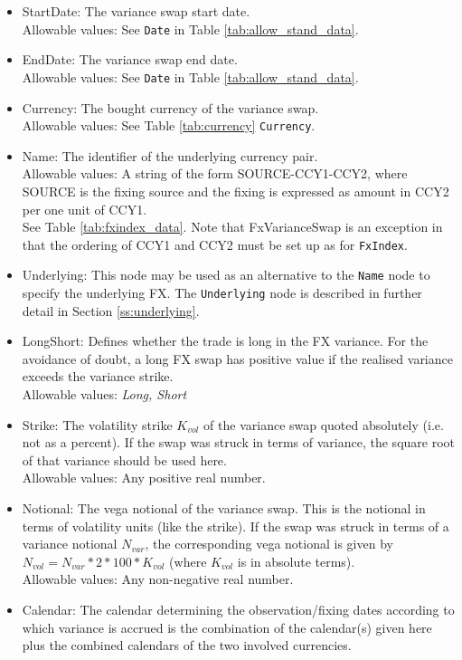 \begin{itemize}
	\item StartDate: The variance swap start date. \\
	Allowable values: See \lstinline!Date! in Table \ref{tab:allow_stand_data}.
	\item EndDate: The variance swap end date. \\
	Allowable values: See \lstinline!Date! in Table \ref{tab:allow_stand_data}.
	\item Currency: The bought currency of the variance swap. \\
	Allowable values: See Table \ref{tab:currency} \lstinline!Currency!.		
	\item Name: The identifier of the underlying currency pair.  \\
	Allowable values:  A string of the form SOURCE-CCY1-CCY2, where SOURCE is the fixing source and the fixing is expressed as amount in CCY2 per one unit of CCY1. \\ See Table \ref{tab:fxindex_data}. Note that FxVarianceSwap is an exception in that the ordering of CCY1 and CCY2 must be set up as for {\tt FxIndex}.
	\item Underlying:  This node may be used as an alternative to the \lstinline!Name! node to specify the underlying FX.  The \lstinline!Underlying! node is described in further detail in Section \ref{ss:underlying}. \\
	\item LongShort: Defines whether the trade is long in the FX variance. For the avoidance of doubt, a long FX swap has positive value if the realised variance exceeds the variance strike. \\
	Allowable values: \emph{Long, Short}	
	\item Strike: The volatility strike $K_{vol}$ of the variance swap quoted absolutely (i.e. not as a percent). If the swap was struck in terms of variance, the square root of that variance should be used here.\\
	Allowable values: Any positive real number.	
	\item Notional: The vega notional of the variance swap. This is the notional in terms of volatility units (like the strike). If the swap was struck in terms of a variance notional $N_{var}$, the corresponding vega notional is given by $N_{vol} = N_{var} * 2 * 100 * K_{vol}$ (where $K_{vol}$ is in absolute terms).\\
	Allowable values: Any non-negative real number.
	\item Calendar: The calendar determining the observation/fixing dates according to which variance is accrued is the combination of the calendar(s) given here plus the combined calendars of the two involved currencies. \\

\end{itemize}
